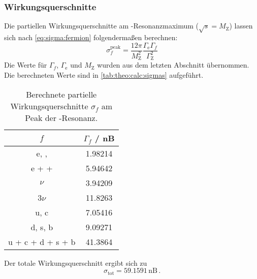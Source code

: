 \subsubsection{Wirkungsquerschnitte}
Die partiellen Wirkungsquerschnitte am \Z-Resonanzmaximum ($\sqrt{s} = M_\text{Z}$) lassen sich nach \autoref{eq:sigma:fermion} folgendermaßen berechnen:
\begin{equation}
    \sigma_f^\text{peak} = \frac{12 \pi}{M_\text{Z}^2} \frac{\Gamma_\text{e} \Gamma_f}{\Gamma_\text{Z}^2}
\end{equation}
Die Werte für $\Gamma_f$, $\Gamma_\text{e}$ und $M_\text{Z}$ wurden aus dem letzten Abschnitt übernommen. Die berechneten Werte sind in 
\autoref{tab:theo:calc:sigmas} aufgeführt.
\begin{table}[H]
    \caption{Berechnete partielle Wirkungsquerschnitte $\sigma_f$ am Peak der \Z-Resonanz.}
    \begin{center}
        \begin{tabular}{|c|c|}
            \hline
            $f$ 					& $\Gamma_f$ / nB 	\\ \hline
      		e, \textmu, \texttau	& 1.98214			\\ \hline
  			e + \textmu + \texttau	& 5.94642			\\ \hline
			$\nu$					& 3.94209			\\ \hline
			3$\nu$					& 11.8263			\\ \hline
			u, c					& 7.05416			\\ \hline
			d, s, b					& 9.09271			\\ \hline
			u + c + d  + s + b		& 41.3864			\\ \hline
        \end{tabular}
    \end{center}
    \label{tab:theo:calc:sigmas}
\end{table}
Der totale Wirkungsquerschnitt ergibt sich zu
\begin{equation}
    \sigma_\text{tot} = 59.1591\,\text{nB} \, .
\end{equation}